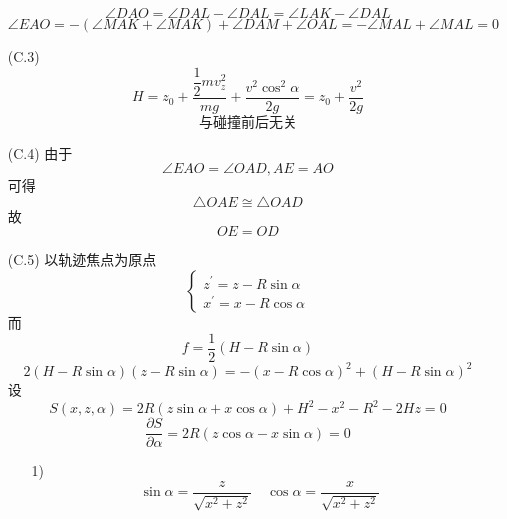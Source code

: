 \documentclass{article}
\begin{document}
\begin{itemize}
    \begin{equation}\angle DAO=\angle DAL-\angle DAL=\angle LAK-\angle DAL\end{equation}
    \begin{equation}\angle EAO=-(\angle MAK+\angle MAK)+\angle DAM+\angle OAL=-\angle MAL+\angle MAL=0\end{equation}
    \item[(C.3)]
    \begin{equation}H=z_{0}+\dfrac{\dfrac{1}{2}mv_z^{2}}{mg}+\frac{v^{2}\cos^{2}\alpha}{2g}=z_{0}+\frac{v^{2}}{2g}\end{equation}
    \begin{equation}与碰撞前后无关\end{equation}
    \item[(C.4)]由于
    \begin{equation}\angle EAO=\angle OAD,AE=AO\end{equation}
    可得
    \begin{equation}\triangle OAE\cong\triangle OAD\end{equation}
    故
    \begin{equation}OE=OD\end{equation}
    \item[(C.5)] 以轨迹焦点为原点
    \begin{equation}\begin{cases}z^{\prime}=z-R\sin\alpha\\x^{\prime}=x-R\cos\alpha\end{cases}\end{equation}
    而
    \begin{equation}f=\dfrac12(H-R\sin\alpha)\end{equation}
    \begin{equation}2(H-R\sin\alpha)(z-R\sin\alpha)=-(x-R\cos\alpha)^2+(H-R\sin\alpha)^2\end{equation}
    设\begin{equation}S(x,z,\alpha)=2R(z\sin\alpha+x\cos\alpha)+H^2-x^2-R^2-2Hz=0\end{equation}
    \begin{equation}\frac{\partial S}{\partial\alpha}=2R\left(z\cos\alpha-x\sin\alpha\right)=0\end{equation}
    \begin{itemize}
        \item[1)]\begin{equation}\sin\alpha=\dfrac{z}{\sqrt{x^2+z^2}}\quad\cos\alpha=\dfrac{x}{\sqrt{x^2+z^2}}\end{equation}

\end{itemize}
\end{itemize}
\end{document}
